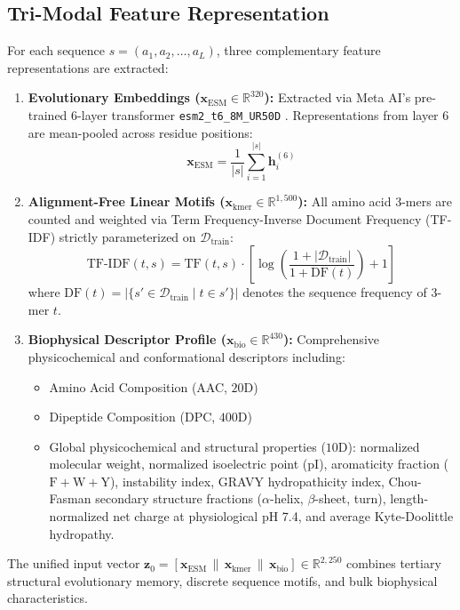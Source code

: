 \documentclass[twocolumn,10pt]{article}
\begin{document}
\subsection{Tri-Modal Feature Representation}
For each sequence $s = (a_1, a_2, \dots, a_L)$, three complementary feature representations are extracted:
\begin{enumerate}
    \item \textbf{Evolutionary Embeddings ($\mathbf{x}_{\text{ESM}} \in \mathbb{R}^{320}$):} Extracted via Meta AI's pre-trained $6$-layer transformer \texttt{esm2\_t6\_8M\_UR50D} \cite{lin2023evolutionary}. Representations from layer $6$ are mean-pooled across residue positions:
    \begin{equation}
    \mathbf{x}_{\text{ESM}} = \frac{1}{|s|} \sum_{i=1}^{|s|} \mathbf{h}_i^{(6)}
    \end{equation}
    \item \textbf{Alignment-Free Linear Motifs ($\mathbf{x}_{\text{kmer}} \in \mathbb{R}^{1,500}$):} All amino acid $3$-mers are counted and weighted via Term Frequency-Inverse Document Frequency (TF-IDF) strictly parameterized on $\mathcal{D}_{\text{train}}$:
    \begin{equation}
    \text{TF-IDF}(t, s) = \text{TF}(t, s) \cdot \left[\log \left( \frac{1 + |\mathcal{D}_{\text{train}}|}{1 + \text{DF}(t)} \right) + 1\right]
    \end{equation}
    where $\text{DF}(t) = |\{s' \in \mathcal{D}_{\text{train}} \mid t \in s'\}|$ denotes the sequence frequency of $3$-mer $t$.
    \item \textbf{Biophysical Descriptor Profile ($\mathbf{x}_{\text{bio}} \in \mathbb{R}^{430}$):} Comprehensive physicochemical and conformational descriptors including:
    \begin{itemize}
        \item Amino Acid Composition (AAC, $20\text{D}$)
        \item Dipeptide Composition (DPC, $400\text{D}$)
        \item Global physicochemical and structural properties ($10\text{D}$): normalized molecular weight, normalized isoelectric point ($\text{pI}$), aromaticity fraction ($\text{F}+\text{W}+\text{Y}$), instability index, GRAVY hydropathicity index, Chou-Fasman secondary structure fractions ($\alpha$-helix, $\beta$-sheet, turn), length-normalized net charge at physiological pH 7.4, and average Kyte-Doolittle hydropathy.
    \end{itemize}
\end{enumerate}
The unified input vector $\mathbf{z}_0 = [\mathbf{x}_{\text{ESM}} \,\|\, \mathbf{x}_{\text{kmer}} \,\|\, \mathbf{x}_{\text{bio}}] \in \mathbb{R}^{2,250}$ combines tertiary structural evolutionary memory, discrete sequence motifs, and bulk biophysical characteristics.
\end{document}
